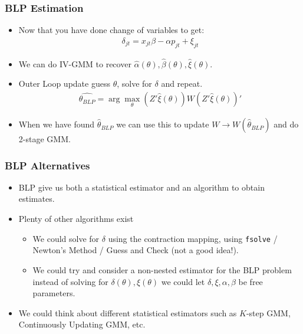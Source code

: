 \documentclass[aspectratio=169,11pt]{beamer}
\begin{document}
 \begin{frame}
\frametitle{BLP Estimation}
\begin{itemize}
 \item Now that you have done change of variables to get:
 \begin{eqnarray*}
\delta_{jt}= x_{jt} \beta -\alpha p_{jt}+  \xi_{jt}
 \end{eqnarray*}
 \item We can do IV-GMM to recover $\hat{\alpha}(\theta),\hat{\beta}(\theta),\hat{\xi}(\theta)$.
 \item Outer Loop update guess $\theta$, solve for $\delta$ and repeat.
 \begin{eqnarray*}
 \widehat{\theta_{BLP}} = \arg \max_{\theta} (Z' \hat{\xi}(\theta)) W  (Z' \hat{\xi}(\theta))'
 \end{eqnarray*}
 \item When we have found $\hat{\theta}_{BLP}$ we can use this to update $W \rightarrow W(\hat{\theta}_{BLP})$ and do 2-stage GMM.
 \end{itemize}
\end{frame}



 \begin{frame}
\frametitle{BLP Alternatives}
\begin{itemize}
 \item BLP give us both a statistical \alert{estimator} and an \alert{algorithm} to obtain estimates.
\item Plenty of other algorithms exist
\begin{itemize}
\item We could solve for $\delta$ using the contraction mapping, using \texttt{fsolve} / Newton's Method / Guess and Check (not a good idea!).
\item We could try and consider a non-nested estimator for the BLP problem instead of solving for $\delta(\theta),\xi(\theta)$ we could let $\delta,\xi,\alpha,\beta$ be free parameters.
 \end{itemize}
\item We could think about different statistical estimators such as $K$-step GMM, Continuously Updating GMM, etc.
 \end{itemize}
\end{frame}
\end{document}
